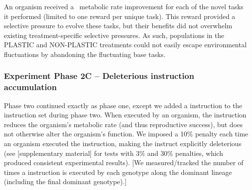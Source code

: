 An organism received a \novelTraitsReward\ metabolic rate improvement for each of the novel tasks it performed (limited to one reward per unique task).
This reward provided a selective pressure to evolve these tasks, but their benefits did not overwhelm existing treatment-specific selective pressures.
As such, populations in the PLASTIC and NON-PLASTIC treatments could not easily escape environmental fluctuations by abandoning the fluctuating base tasks.

\subsubsection{Experiment Phase 2C -- Deleterious instruction accumulation}

Phase two continued exactly as phase one, except we added a  instruction to the instruction set during phase two.
When executed by an organism, the  instruction reduces the organism's metabolic rate (and thus reproductive success), but does not otherwise alter the organism's function.
We imposed a 10\% penalty each time an organism executed the  instruction, making the instruct explicitly deleterious (see [supplementary material] for tests with 3\% and 30\% penalties, which produced consistent experimental results).
[We measured/tracked the number of times a  instruction is executed by each genotype along the dominant lineage (including the final dominant genotype).]



